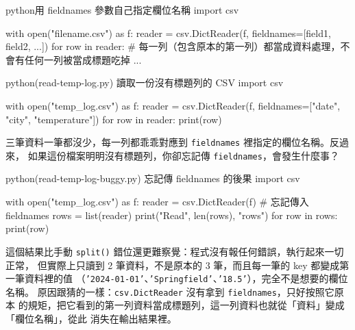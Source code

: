 \begin{code}{python}{用 fieldnames 參數自己指定欄位名稱}
import csv

with open("filename.csv") as f:
    reader = csv.DictReader(f, fieldnames=[field1, field2, ...])
    for row in reader:
        # 每一列（包含原本的第一列）都當成資料處理，不會有任何一列被當成標題吃掉
        ...
\end{code}

\begin{example}{python}{(read-temp-log.py) 讀取一份沒有標題列的 CSV}
import csv

with open("temp_log.csv") as f:
    reader = csv.DictReader(f, fieldnames=["date", "city", "temperature"])
    for row in reader:
        print(row)
\end{example}


三筆資料一筆都沒少，每一列都乖乖對應到 \texttt{fieldnames} 裡指定的欄位名稱。反過來，
如果這份檔案明明沒有標題列，你卻忘記傳 \texttt{fieldnames}，會發生什麼事？

\begin{example}{python}{(read-temp-log-buggy.py) 忘記傳 fieldnames 的後果}
import csv

with open("temp_log.csv") as f:
    reader = csv.DictReader(f)                # 忘記傳入 fieldnames
    rows = list(reader)
    print("Read", len(rows), "rows")
    for row in rows:
        print(row)
\end{example}


這個結果比手動 \texttt{split()} 錯位還更難察覺：程式沒有報任何錯誤，執行起來一切正常，
但實際上只讀到 2 筆資料，不是原本的 3 筆，而且每一筆的 key 都變成第一筆資料裡的值
（\texttt{'2024-01-01'}、\texttt{'Springfield'}、\texttt{'18.5'}），完全不是想要的欄位名稱。
原因跟猜的一樣：\texttt{csv.DictReader} 沒有拿到 \texttt{fieldnames}，只好按照它原本
的規矩，把它看到的第一列資料當成標題列，這一列資料也就從「資料」變成「欄位名稱」，從此
消失在輸出結果裡。

